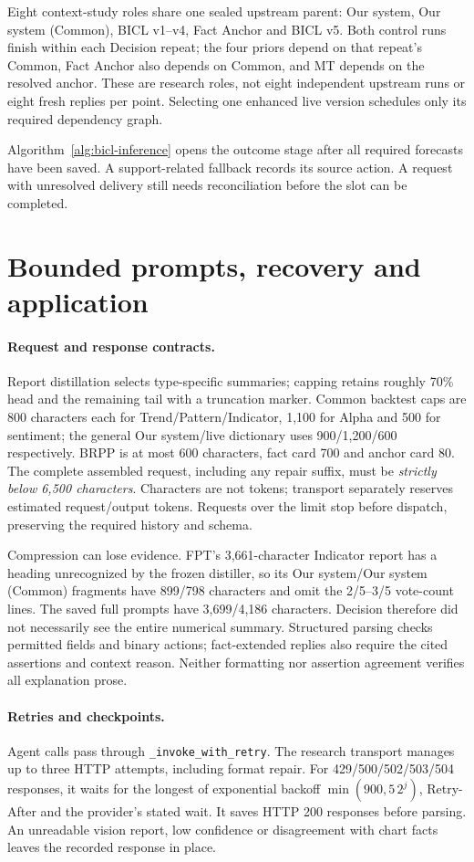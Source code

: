 Eight context-study roles share one sealed upstream parent: Our system,
Our system (Common), BICL v1--v4, Fact Anchor and BICL v5. Both control runs finish
within each Decision repeat; the four priors depend on that repeat's
Common, Fact Anchor also depends on Common, and MT depends on the resolved
anchor. These are research roles, not eight independent upstream runs or
eight fresh replies per point. Selecting one enhanced live version
schedules only its required dependency graph.

Algorithm~\ref{alg:bicl-inference} opens the outcome stage after all
required forecasts have been saved. A support-related fallback records
its source action. A request with unresolved delivery still needs
reconciliation before the slot can be completed.

\section{Bounded prompts, recovery and application}\label{s:052b7113d7072810}
\paragraph{Request and response contracts.}
Report distillation selects type-specific summaries; capping retains
roughly 70\% head and the remaining tail with a truncation marker.
Common backtest caps are 800 characters each for Trend/Pattern/Indicator,
1,100 for Alpha and 500 for sentiment; the general Our system/live dictionary
uses 900/1,200/600 respectively. BRPP is at most 600 characters, fact card
700 and anchor card 80. The complete assembled request, including any
repair suffix, must be \emph{strictly below 6,500 characters}. Characters
are not tokens; transport separately reserves estimated request/output
tokens. Requests over the limit stop before dispatch, preserving the
required history and schema.

Compression can lose evidence. FPT's 3,661-character Indicator report has
a heading unrecognized by the frozen distiller, so its Our system/Our system (Common)
fragments have 899/798 characters and omit the 2/5--3/5 vote-count lines.
The saved full prompts have 3,699/4,186 characters. Decision therefore
did not necessarily see the entire numerical summary. Structured parsing
checks permitted fields and binary actions; fact-extended replies also
require the cited assertions and context reason. Neither formatting nor
assertion agreement verifies all explanation prose.

\paragraph{Retries and checkpoints.}
Agent calls pass through \texttt{\_invoke\_with\_retry}. The research
transport manages up to three HTTP attempts, including format repair.
For 429/500/502/503/504 responses, it waits for the longest of exponential
backoff $\min(900,5\,2^j)$, Retry-After and the provider's stated wait.
It saves HTTP 200 responses before parsing. An unreadable vision report,
low confidence or disagreement with chart facts leaves the recorded
response in place.

